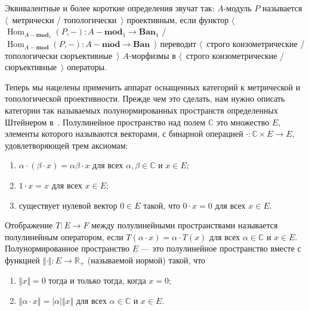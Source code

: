 Эквивалентные и более короткие определения звучат так: $A$-модуль $P$ называется
$\langle$~метрически / топологически~$\rangle$ проективным, если функтор
$\langle$~$\operatorname{Hom}_{A-\mathbf{mod}_1}(P,-)
    :A-\mathbf{mod}_1\to\mathbf{Ban}_1$
/
$\operatorname{Hom}_{A-\mathbf{mod}}(P,-)
    :A-\mathbf{mod}\to\mathbf{Ban}$~$\rangle$
переводит $\langle$~строго коизометрические / топологически
сюръективные~$\rangle$ $A$-морфизмы в $\langle$~строго коизометрические /
сюръективные~$\rangle$ операторы.

Теперь мы нацелены применить аппарат оснащенных категорий к метрической и
топологической проективности. Прежде чем это сделать, нам нужно описать
категории так называемых полунормированных пространств определенных Штейнером
в~\cite{ShtTopFrClassicQuantMod}. Полулинейное пространство над полем
$\mathbb{C}$ это множество $E$, элементы которого называются векторами, с
бинарной операцией $\cdot:\mathbb{C}\times E\to E$, удовлетворяющей трем
аксиомам:
\begin{enumerate}[label = (\roman*)]
    \item $\alpha\cdot(\beta\cdot x)=\alpha\beta\cdot x$ для всех
    $\alpha,\beta\in\mathbb{C}$ и $x\in E$; 

    \item $1\cdot x=x$ для всех $x\in E$; 

    \item существует нулевой вектор $0\in E$ такой, что $0\cdot x=0$ для всех 
    $x\in E$. 
\end{enumerate}

Отображение $T:E\to F$ между полулинейными пространствами называется
полулинейным оператором, если $T(\alpha\cdot x)=\alpha\cdot T(x)$ для всех
$\alpha\in\mathbb{C}$ и $x\in E$. Полунормированное пространство $E$ --- это
полулинейное пространство вместе с функцией  $\Vert\cdot\Vert:E\to\mathbb{R}_+$
(называемой нормой) такой, что
\begin{enumerate}[label = (\roman*)]
    \item $\Vert x\Vert=0$ тогда и только тогда, когда $x=0$;

    \item $\Vert\alpha\cdot x\Vert=|\alpha|\Vert x\Vert$ для всех
    $\alpha\in\mathbb{C}$ и $x\in E$. 
\end{enumerate}

